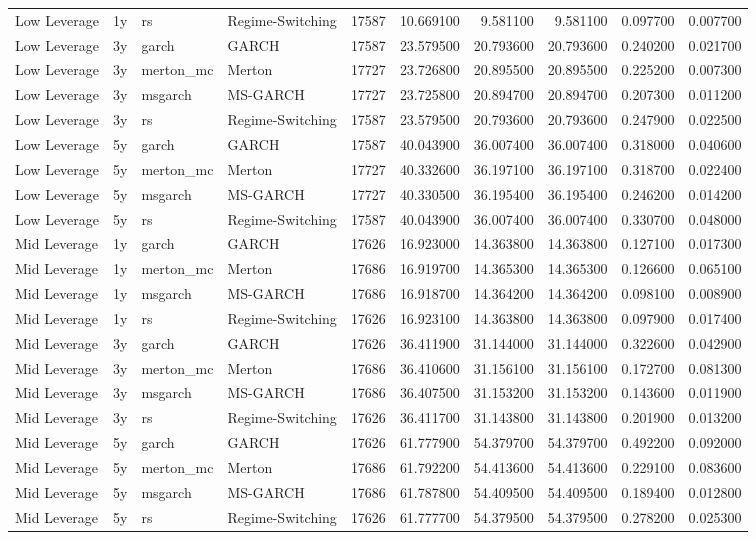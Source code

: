 \begin{table}[htbp]
{\begin{tabular}{llllrrrrrr}
Low Leverage & 1y & rs & Regime-Switching & 17587 & 10.669100 & 9.581100 & 9.581100 & 0.097700 & 0.007700 \\
Low Leverage & 3y & garch & GARCH & 17587 & 23.579500 & 20.793600 & 20.793600 & 0.240200 & 0.021700 \\
Low Leverage & 3y & merton\_mc & Merton & 17727 & 23.726800 & 20.895500 & 20.895500 & 0.225200 & 0.007300 \\
Low Leverage & 3y & msgarch & MS-GARCH & 17727 & 23.725800 & 20.894700 & 20.894700 & 0.207300 & 0.011200 \\
Low Leverage & 3y & rs & Regime-Switching & 17587 & 23.579500 & 20.793600 & 20.793600 & 0.247900 & 0.022500 \\
Low Leverage & 5y & garch & GARCH & 17587 & 40.043900 & 36.007400 & 36.007400 & 0.318000 & 0.040600 \\
Low Leverage & 5y & merton\_mc & Merton & 17727 & 40.332600 & 36.197100 & 36.197100 & 0.318700 & 0.022400 \\
Low Leverage & 5y & msgarch & MS-GARCH & 17727 & 40.330500 & 36.195400 & 36.195400 & 0.246200 & 0.014200 \\
Low Leverage & 5y & rs & Regime-Switching & 17587 & 40.043900 & 36.007400 & 36.007400 & 0.330700 & 0.048000 \\
Mid Leverage & 1y & garch & GARCH & 17626 & 16.923000 & 14.363800 & 14.363800 & 0.127100 & 0.017300 \\
Mid Leverage & 1y & merton\_mc & Merton & 17686 & 16.919700 & 14.365300 & 14.365300 & 0.126600 & 0.065100 \\
Mid Leverage & 1y & msgarch & MS-GARCH & 17686 & 16.918700 & 14.364200 & 14.364200 & 0.098100 & 0.008900 \\
Mid Leverage & 1y & rs & Regime-Switching & 17626 & 16.923100 & 14.363800 & 14.363800 & 0.097900 & 0.017400 \\
Mid Leverage & 3y & garch & GARCH & 17626 & 36.411900 & 31.144000 & 31.144000 & 0.322600 & 0.042900 \\
Mid Leverage & 3y & merton\_mc & Merton & 17686 & 36.410600 & 31.156100 & 31.156100 & 0.172700 & 0.081300 \\
Mid Leverage & 3y & msgarch & MS-GARCH & 17686 & 36.407500 & 31.153200 & 31.153200 & 0.143600 & 0.011900 \\
Mid Leverage & 3y & rs & Regime-Switching & 17626 & 36.411700 & 31.143800 & 31.143800 & 0.201900 & 0.013200 \\
Mid Leverage & 5y & garch & GARCH & 17626 & 61.777900 & 54.379700 & 54.379700 & 0.492200 & 0.092000 \\
Mid Leverage & 5y & merton\_mc & Merton & 17686 & 61.792200 & 54.413600 & 54.413600 & 0.229100 & 0.083600 \\
Mid Leverage & 5y & msgarch & MS-GARCH & 17686 & 61.787800 & 54.409500 & 54.409500 & 0.189400 & 0.012800 \\
Mid Leverage & 5y & rs & Regime-Switching & 17626 & 61.777700 & 54.379500 & 54.379500 & 0.278200 & 0.025300 \\
\bottomrule
\end{tabular}
}
\end{table}
